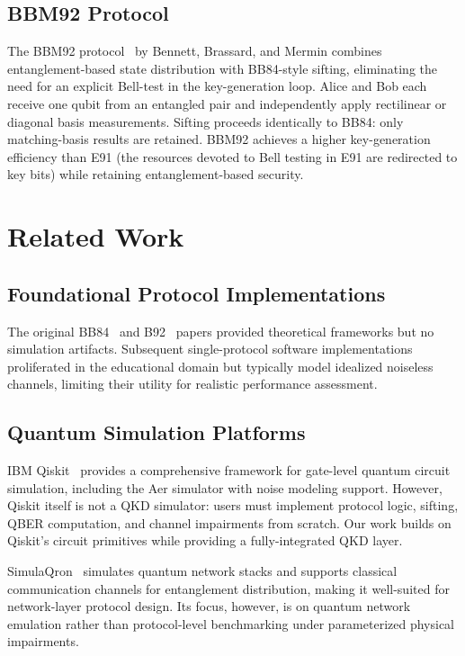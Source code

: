 \documentclass[journal]{IEEEtran}
\begin{document}
\subsection{BBM92 Protocol}

The BBM92 protocol~\cite{bbm92} by Bennett, Brassard, and Mermin
combines entanglement-based state distribution with BB84-style sifting,
eliminating the need for an explicit Bell-test in the key-generation
loop. Alice and Bob each receive one qubit from an entangled pair and
independently apply rectilinear or diagonal basis measurements. Sifting
proceeds identically to BB84: only matching-basis results are retained.
BBM92 achieves a higher key-generation efficiency than E91 (the
resources devoted to Bell testing in E91 are redirected to key bits)
while retaining entanglement-based security.

\section{Related Work}
\label{sec:related}

\subsection{Foundational Protocol Implementations}

The original BB84~\cite{bb84} and B92~\cite{b92} papers provided
theoretical frameworks but no simulation artifacts. Subsequent
single-protocol software implementations proliferated in the educational
domain but typically model idealized noiseless channels, limiting their
utility for realistic performance assessment.

\subsection{Quantum Simulation Platforms}

IBM Qiskit~\cite{qiskit} provides a comprehensive framework for
gate-level quantum circuit simulation, including the Aer simulator
with noise modeling support. However, Qiskit itself is not a QKD
simulator: users must implement protocol logic, sifting, QBER
computation, and channel impairments from scratch. Our work builds on
Qiskit's circuit primitives while providing a fully-integrated QKD
layer.

SimulaQron~\cite{simulaqron} simulates quantum network stacks and
supports classical communication channels for entanglement distribution,
making it well-suited for network-layer protocol design. Its focus,
however, is on quantum network emulation rather than protocol-level
benchmarking under parameterized physical impairments.
\end{document}
